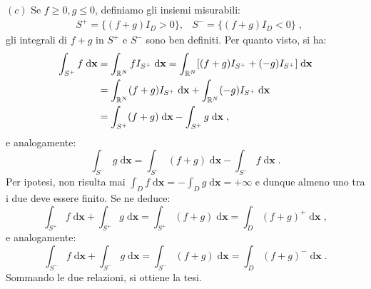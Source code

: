 \documentclass[a4paper,12pt]{report}
\theoremstyle{plain}
\theoremstyle{definition}
\theoremstyle{remark}
\newcommand{\diff}[1]{\mathrm{d}#1}
\numberwithin{equation}{section}
\begin{document}
$(c)$ Se $f\ge0,g\le0$, definiamo gli insiemi misurabili:
\begin{align}
&S^+=\{(f+g)I_D>0\}, &S^-=\{(f+g)I_D<0\}\;,
\end{align}
gli integrali di $f+g$ in $S^+$ e $S^-$ sono ben definiti. Per quanto visto, si ha:
\begin{align}
\int_{S^+}f\;\diff{\mathbf{x}} &=\int_{\mathbb{R}^N}fI_{S^+}\;\diff{\mathbf{x}}=\int_{\mathbb{R}^N}[(f+g)I_{S^+}+(-g)I_{S^+}]\;\diff{\mathbf{x}} \notag \\
&=\int_{\mathbb{R}^N}(f+g)I_{S^+}\;\diff{\mathbf{x}}+\int_{\mathbb{R}^N}(-g)I_{S^+}\;\diff{\mathbf{x}}\notag \\
&=\int_{S^+}(f+g)\;\diff{\mathbf{x}}-\int_{S^+} g\;\diff{\mathbf{x}}\;,
\end{align}
e analogamente:
\begin{equation}
\int_{S^-}g\;\diff{\mathbf{x}}=\int_{S^-}(f+g)\;\diff{\mathbf{x}}-\int_{S^-}f\;\diff{\mathbf{x}}\;.
\end{equation}
Per ipotesi, non risulta mai $\int_D f\;\diff{\mathbf{x}}=-\int_D g\;\diff{\mathbf{x}}=+\infty$ e dunque almeno uno tra i due deve essere finito. Se ne deduce:
\begin{equation}
\int_{S^+}f\;\diff{\mathbf{x}}+\int_{S^+}g\;\diff{\mathbf{x}}=\int_{S^+}(f+g)\;\diff{\mathbf{x}}=\int_D(f+g)^+\;\diff{\mathbf{x}}\;,
\end{equation}
e analogamente:
\begin{equation}
\int_{S^-}f\;\diff{\mathbf{x}}+\int_{S^-}g\;\diff{\mathbf{x}}=\int_{S^-}(f+g)\;\diff{\mathbf{x}}=\int_D(f+g)^-\;\diff{\mathbf{x}}\;.
\end{equation}
Sommando le due relazioni, si ottiene la tesi. \\
\end{document}
